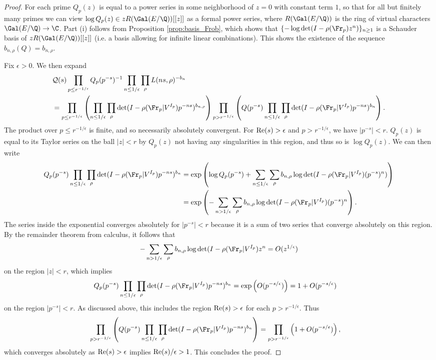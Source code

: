 \documentclass[12pt]{amsart}
\theoremstyle{plain}
\begin{document}
\begin{proof}
    For each prime $Q_p(z)$ is equal to a power series in some neighborhood of $z=0$ with constant term $1$, so that for all but finitely many primes we can view $\log Q_p(z)\in zR(\Gal(E/\Q))[[z]]$ as a formal power series, where $R(\Gal(E/\Q))$ is the ring of virtual characters $\Gal(E/\Q)\to \C$. Part (i) follows from Proposition \ref{prop:basis_Frob}, which shows that $\{-\log\det(I-\rho(\Fr_p)z^n)\}_{n\ge 1}$ is a Schauder basis of $zR(\Gal(E/\Q))[[z]]$ (i.e. a basis allowing for infinite linear combinations). This shows the existence of the sequence $b_{n,\rho}(Q)=b_{n,\rho}$.

    Fix $\epsilon > 0$. We then expand
    \begin{align*}
        &\mathcal{Q}(s) \prod_{p\le r^{-1/\epsilon}}Q_p(p^{-s})^{-1}\prod_{n\le 1/\epsilon}\prod_\rho L(ns,\rho)^{-b_n}\\
        &=\prod_{p\le r^{-1/\epsilon}}\left(\prod_{n\le 1/\epsilon}\prod_\rho\det(I-\rho(\Fr_p|V^{I_p})p^{-ns})^{b_{n,\rho}}\right) \prod_{p> r^{-1/\epsilon}}\left(Q(p^{-s})\prod_{n\le 1/\epsilon}\prod_\rho\det(I-\rho(\Fr_p|V^{I_p})p^{-ns})^{b_n}\right).
    \end{align*}
    The product over $p\le r^{-1/\epsilon}$ is finite, and so necessarily absolutely convergent. For ${\rm Re}(s) > \epsilon$ and $p>r^{-1/\epsilon}$, we have $|p^{-s}| < r$. $Q_p(z)$ is equal to its Taylor series on the ball $|z|<r$ by $Q_p(z)$ not having any singularities in this region, and thus so is $\log Q_p(z)$. We can then write
    \begin{align*}
        Q_p(p^{-s})\prod_{n\le 1/\epsilon}\prod_\rho\det(I-\rho(\Fr_p|V^{I_p})p^{-ns})^{b_n} &= \exp\left(\log Q_p(p^{-s}) + \sum_{n\le 1/\epsilon}\sum_{\rho} b_{n,\rho}\log\det(I-\rho(\Fr_p|V^{I_p})(p^{-s})^n)\right)\\
        &=\exp\left(-\sum_{n> 1/\epsilon}\sum_{\rho} b_{n,\rho}\log\det(I-\rho(\Fr_p|V^{I_p})(p^{-s})^n\right).
    \end{align*}
    The series inside the exponential converges absolutely for $|p^{-s}| < r$ because it is a sum of two series that converge absolutely on this region. By the remainder theorem from calculus, it follows that
    \[
        -\sum_{n> 1/\epsilon} \sum_{\rho} b_{n,\rho}\log\det(I-\rho(\Fr_p|V^{I_p})z^n= O(z^{1/\epsilon})
    \]
    on the region $|z|<r$, which implies
    \begin{align*}
        Q_p(p^{-s})\prod_{n\le 1/\epsilon}\prod_\rho\det(I-\rho(\Fr_p|V^{I_p})p^{-ns})^{b_n} &= \exp\left(O(p^{-s/\epsilon})\right) = 1 + O(p^{-s/\epsilon})
    \end{align*}
    on the region $|p^{-s}| < r$. As discussed above, this includes the region ${\rm Re}(s) > \epsilon$ for each $p > r^{-1/\epsilon}$. Thus
    \begin{align*}
        \prod_{p> r^{-1/\epsilon}}\left(Q(p^{-s})\prod_{n\le 1/\epsilon}\prod_\rho\det(I-\rho(\Fr_p|V^{I_p})p^{-ns})^{b_n}\right) &= \prod_{p>r^{-1/\epsilon}}\left(1 + O(p^{-s/\epsilon})\right),
    \end{align*}
    which converges absolutely as ${\rm Re}(s) > \epsilon$ implies ${\rm Re}(s)/\epsilon > 1$. This concludes the proof.
\end{proof}
\end{document}
